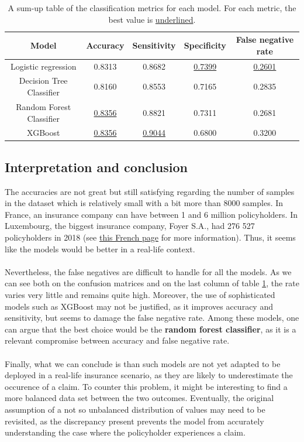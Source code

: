 \documentclass[a4paper,11pt, titlepage]{article}
\begin{document}
\begin{table}[h!]
    \begin{tabular}[t]{|c|cccc|}
        \rowcolor{orange!30}
\hline
\textbf{Model} & \textbf{Accuracy} & \textbf{Sensitivity} & \textbf{Specificity} & \textbf{False negative rate} \\
\hline
Logistic regression         & 0.8313             & 0.8682             & \underline{0.7399} & \underline{0.2601} \\
Decision Tree Classifier    & 0.8160             & 0.8553             & 0.7165             & 0.2835 \\
Random Forest Classifier    & \underline{0.8356} & 0.8821             & 0.7311             & 0.2681 \\
XGBoost                     & \underline{0.8356}             & \underline{0.9044} & 0.6800             & 0.3200 \\
\hline
    \end{tabular}
\centering
\caption{A sum-up table of the classification metrics for each model. For each metric, the best value is \underline{underlined}.}
\label{metrics}
\end{table}%

\subsection{Interpretation and conclusion}

The accuracies are not great but still satisfying regarding the number of samples in the dataset which is relatively small with a bit more than 8000 samples. In France, an insurance company can have between 1 and 6 million policyholders. In Luxembourg, the biggest insurance company, Foyer S.A., had 276 527 policyholders in 2018 (see \href{https://fr.wikipedia.org/wiki/Liste_de_groupes_d%27assurance}{this French page} for more information). Thus, it seems like the models would be better in a real-life context.\\
\\
\noindent Nevertheless, the false negatives are difficult to handle for all the models. As we can see both on the confusion matrices and on the last column of table \ref{metrics}, the rate varies very little and remains quite high. Moreover, the use of sophisticated models such as XGBoost may not be justified, as it improves accuracy and sensitivity, but seems to damage the false negative rate. Among these models, one can argue that the best choice would be the \textbf{random forest classifier}, as it is a relevant compromise between accuracy and false negative rate. \\
\\
\noindent Finally, what we can conclude is than such models are not yet adapted to be deployed in a real-life insurance scenario, as they are likely to underestimate the occurence of a claim. To counter this problem, it might be interesting to find a more balanced data set between the two outcomes. Eventually, the original assumption of a not so unbalanced distribution of values may need to be revisited, as the discrepancy present prevents the model from accurately understanding the case where the policyholder experiences a claim.  
\end{document}
